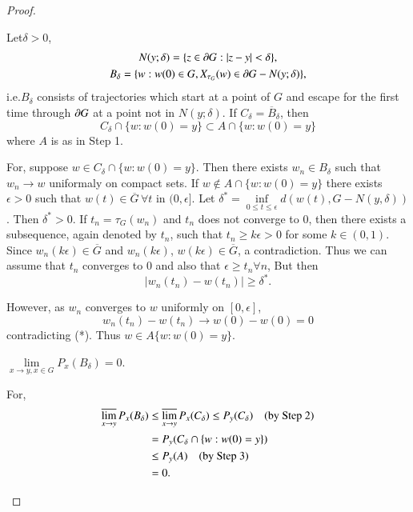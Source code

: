 \begin{proof}
\begin{step}%
Let\pageoriginale $\delta>0$,
\begin{gather*}
N(y;\delta)=\{z\in \partial G:|z-y|<\delta\},\\
B_{\delta}=\{w:w(0)\in G, X_{\tau_{G}}(w)\in \partial G-N(y;\delta)\},
\end{gather*}
i.e.\@ $B_{\delta}$ consists of trajectories which start at a point of
$G$ and escape for the first time through $\partial G$ at a point not in
$N(y;\delta)$. If $C_{\delta}=\overline{B}_{\delta}$, then
$$
C_{\delta}\cap\{w:w(0)=y\}\subset A\cap \{w:w(0)=y\}
$$
where $A$ is as in Step 1.
\end{step}

For, suppose $w\in C_{\delta}\cap \{w:w(0)=y\}$. Then there exists
$w_{n}\in B_{\delta}$ such that $w_{n}\to w$ uniformaly on compact
sets. If $w\not\in A\cap \{w:w(0)=y\}$ there exists $\epsilon>0$ such
that $w(t)\in \overline{G}\,\forall t$ in $(0,\epsilon]$. Let
  $\delta^{*}=\inf\limits_{0\leq t\leq
    \epsilon}d(w(t),G-N(y,\delta))$. Then $\delta^{*}>0$. If
  $t_{n}=\tau_{G}(w_{n})$ and $t_{n}$ does not converge to $0$, then
  there exists a subsequence, again denoted by $t_{n}$, such that
  $t_{n}\geq k\epsilon>0$ for some $k\in (0,1)$. Since
  $w_{n}(k\epsilon)\in \overline{G}$ and $w_{n}(k\epsilon)$,
  $w(k\epsilon)\in \overline{G}$, a contradiction. Thus we can assume
  that $t_{n}$ converges to $0$ and also that $\epsilon\geq
  t_{n}\forall n$, But then
\begin{equation*}
|w_{n}(t_{n})-w(t_{n})|\geq \delta^{*}.\tag{*}
\end{equation*}

However, as $w_{n}$ converges to $w$ uniformly on $[0,\epsilon]$, 
$$
w_{n}(t_{n})-w(t_{n})\to w(0)-w(0)=0
$$
contradicting (*). Thus $w\in A\{w:w(0)=y\}$.

\begin{step}%
$\lim\limits_{x\to y,x\in G}P_{x}(B_{\delta})=0$.

For,\pageoriginale
\begin{align*}
\varlimsup\limits_{x\to y}P_{x}(B_{\delta}) &\leq
\varlimsup\limits_{x\to y}P_{x}(C_{\delta})\leq P_{y}(C_{\delta})\quad
\text{(by Step 2)}\\
&= P_{y}(C_{\delta}\cap \{w:w(0)=y\})\\
&\leq P_{y}(A)\quad\text{(by Step 3)}\\
&= 0.
\end{align*}
\end{step}


\end{proof}
